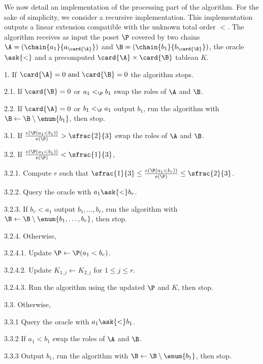 We now detail an implementation of the processing part of the algorithm. For the sake of simplicity,
we consider a recursive implementation. This implementation outputs a linear
extension compatible with the unknown total order \(<\). The algorithm receives as
input the poset \(\P\) covered by two chains \(\A =
(\chain{a_1}{a_{\card{\A}}})\) and \(\B = (\chain{b_1}{b_{\card{\B}}})\), the oracle
\(\ask{<}\) and a precomputed \(\card{\A} \times \card{\B}\) tableau \(K\).


\begin{algorithm}
\item[1.] If \(\card{\A} = 0 \text{ and } \card{\B} = 0\) the algorithm stops.
\item[2.1.] If \(\card{\B} = 0\) or \(a_1 <_{\P} b_1\) swap the roles of \(\A\) and \(\B\).
\item[2.2.] If \(\card{\A} = 0\) or \(b_1 <_{\P} a_1\) output
\(b_1\), run the
algorithm with \(\B \gets \B \setminus \enum{b_1}\), then stop.
\item[3.1.] If \(\frac{e(\P(a_1 < b_1))}{e(\P)} > \sfrac{2}{3}\) swap the
roles of \(\A\) and \(\B\).
\item[3.2.] If \(\frac{e(\P(a_1 < b_1))}{e(\P)} < \sfrac{1}{3}\),
\item[3.2.1.] Compute \(r\) such that \(\sfrac{1}{3} \le \frac{e(\P(a_1 < b_r))}{e(\P)} \le \sfrac{2}{3}\).
\item[3.2.2.] Query the oracle with \(a_1 \ask{<} b_r\).
\item[3.2.3.] If \(b_r < a_1\) output
\(b_1,\ldots,b_r\), run the algorithm with \(\B \gets \B
\setminus \enum{b_1,\ldots,b_r}\), then stop.
\item[3.2.4.] Otherwise,
\item[3.2.4.1.] Update \(\P \gets \P( a_1 < b_r )\).
\item[3.2.4.2.] Update \(K_{1,j} \gets K_{2,j}\) for \(1 \le j \le r\).
\item[3.2.4.3.] Run the algorithm using the updated \(\P\) and \(K\), then stop.
\item[3.3.] Otherwise,
\item[3.3.1] Query the oracle with \(a_1 \ask{<} b_1\).
\item[3.3.2] If \(a_1 < b_1\) swap the roles of \(\A\) and \(\B\).
\item[3.3.3] Output \(b_1\), run the algorithm with \(\B \gets \B \setminus
\enum{b_1}\), then stop.
\end{algorithm}

